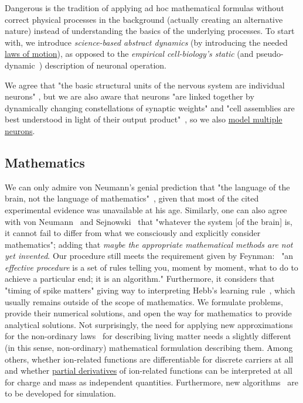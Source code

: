 Dangerous is the tradition of applying ad hoc mathematical formulas
without correct physical processes in the background (actually creating an alternative nature)
instead of understanding the basics of the underlying processes.
To start with, we introduce \textit{science-based abstract dynamics}
(by introducing the needed 
\hyperlink{PhysicsLawsOfMotion}
{laws of motion}),
as opposed to the \textit{empirical cell-biology's static} (and pseudo-dynamic~\cite{GertstnerSpikingNeuronModels:2002}) description of neuronal operation.

We agree that "the basic structural units of the nervous system are individual neurons"
\cite{JohnstonWuNeurophysiology:1995}, but
we are also aware that neurons "are linked together
by dynamically changing constellations of synaptic weights" and
"cell assemblies are best understood in light of their output product"~\cite{BuzsakiCellAssemblies:2010,VeghNeuralShannon:2022},
so we also 
\hyperlink{Multiple_neurons}
{model multiple neurons}.


\subsection*{Mathematics\label{sec:StateMathematics}}
We can only admire von Neumann's genial prediction that "the language of the brain, not the language of mathematics"~\cite{vonNeumannBrain}, given that most of the cited experimental evidence was unavailable at his age.
Similarly, one can also agree with von Neumann~\cite{EDVACreport1945} and Sejnowski~\cite{SejnowskiNeuralComputation:1999} that "whatever the system [of the brain] is, it cannot fail to differ from what we consciously and explicitly consider mathematics"; adding that \textit{maybe the appropriate mathematical methods are not yet invented}. 
Our procedure still meets
the requirement given by Feynman:~\cite{FeynmanComputation:2018}
"an \emph{effective procedure} is a set of rules
telling you, moment by moment, what to do to achieve a particular
end; it is an algorithm."  Furthermore, it considers
that "timing of spike matters" giving way to interpreting Hebb's learning
rule~\cite{HebbBook:1949,HebbianLearningRule:2008}, which usually remains outside of the scope of mathematics. We formulate problems, provide their numerical solutions, and open the way for mathematics to provide analytical solutions.
Not surprisingly, the need for applying new approximations for the non-ordinary laws~\cite{VeghNon-ordinaryLaws:2025} for describing living matter needs a
slightly different (in this sense, non-ordinary) mathematical formulation describing them.
Among others, whether ion-related functions are differentiable for discrete carriers at all and whether
\hyperlink{PartialDerivative}{partial derivatives} of
ion-related functions can be interpreted at all for charge and mass as independent quantities. 
 Furthermore, new algorithms~\cite{VeghNeuronAlgorithms:2025} are to be developed 
for simulation.




